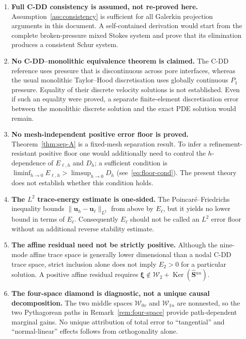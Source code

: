 \documentclass[11pt,a4paper]{article}
\theoremstyle{definition}
\newcommand{\vel}{\bm{u}}
\newcommand{\Schur}{\mathbf{S}}
\newcommand{\Shatuu}{\widehat{\Schur}{}^{uu}}
\newcommand{\Ker}{\operatorname{Ker}}
\newcommand{\Wspace}{\mathcal{W}}
\begin{document}
\begin{enumerate}[leftmargin=*,itemsep=4pt]
  \item \textbf{Full C-DD consistency is assumed, not re-proved here.}
    Assumption~\ref{ass:consistency} is sufficient for all Galerkin
    projection arguments in this document.  A self-contained derivation
    would start from the complete broken-pressure mixed Stokes system
    and prove that its elimination produces a consistent Schur system.

  \item \textbf{No C-DD--monolithic equivalence theorem is claimed.}
    The C-DD reference uses pressure that is discontinuous across pore
    interfaces, whereas the usual monolithic Taylor--Hood discretisation
    uses globally continuous $P_1$ pressure.  Equality of their discrete
    velocity solutions is not established.  Even if such an equality
    were proved, a separate finite-element discretisation error between
    the monolithic discrete solution and the exact PDE solution would
    remain.

  \item \textbf{No mesh-independent positive error floor is proved.}
    Theorem~\ref{thm:sep-A} is a fixed-mesh separation result.  To infer
    a refinement-resistant positive floor one would additionally need
    to control the $h$-dependence of $E_{\ell,h}$ and $D_h$; a sufficient
    condition is $\liminf_{h\to0}E_{\ell,h} > \limsup_{h\to0}D_h$
    (see~\eqref{eq:floor-cond}).  The present theory does not establish
    whether this condition holds.

  \item \textbf{The $L^2$ trace-energy estimate is one-sided.}
    The Poincar\'e--Friedrichs inequality bounds
    $\|\vel_h-\vel_\ell\|_{L^2}$ from above by $E_\ell$, but it yields no
    lower bound in terms of $E_\ell$.  Consequently $E_\ell$ should not
    be called an $L^2$ error floor without an additional reverse
    stability estimate.

  \item \textbf{The affine residual need not be strictly positive.}
    Although the nine-mode affine trace space is generally lower
    dimensional than a nodal C-DD trace space, strict inclusion alone
    does not imply $E_2>0$ for a particular solution.  A positive
    affine residual requires
    $\bm{\xi}\notin\Wspace_2+\Ker(\Shatuu)$.

  \item \textbf{The four-space diamond is diagnostic, not a unique
    causal decomposition.}
    The two middle spaces $\Wspace_{0v}$ and $\Wspace_{1n}$ are
    nonnested, so the two Pythagorean paths in
    Remark~\ref{rem:four-space} provide path-dependent marginal gains.
    No unique attribution of total error to ``tangential'' and
    ``normal-linear'' effects follows from orthogonality alone.


\end{enumerate}
\end{document}
